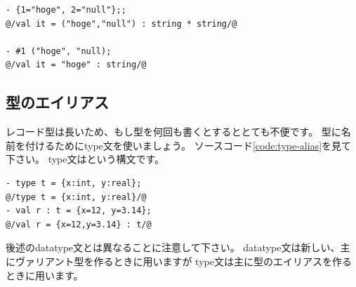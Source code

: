 \documentclass[11pt,a4paper]{jarticle}
\begin{document}
\begin{lstlisting}[caption=タプルはレコード,label=code:tuple-is-record]
- {1="hoge", 2="null"};;
@/val it = ("hoge","null") : string * string/@

- #1 ("hoge", "null);
@/val it = "hoge" : string/@
\end{lstlisting}

\subsection{型のエイリアス}

レコード型は長いため、もし型を何回も書くとするととても不便です。
型に名前を付けるためにtype文を使いましょう。
ソースコード\ref{code:type-alias}を見て下さい。
type文はという構文です。

\begin{lstlisting}[caption=型のエイリアス,label=code:type-alias]
- type t = {x:int, y:real};
@/type t = {x:int, y:real}/@
- val r : t = {x=12, y=3.14};
@/val r = {x=12,y=3.14} : t/@
\end{lstlisting}

後述のdatatype文とは異なることに注意して下さい。
datatype文は新しい、主にヴァリアント型を作るときに用いますが
type文は主に型のエイリアスを作るときに用います。
\end{document}
